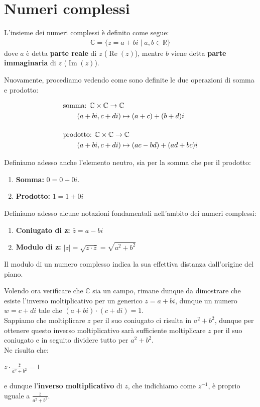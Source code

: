 \documentclass[12pt]{report}
\newcommand{\R}{\mathbb{R}}
\newcommand{\C}{\mathbb{C}}
\begin{document}
	\section{Numeri complessi}
	L'insieme dei numeri complessi è definito come segue:
	\[
		\begin{aligned}
			\C = \{ z = a + bi \mid a, b \in \R \}
		\end{aligned}
	\]
	dove $a$ è detta \textbf{parte reale} di $z$ ($\operatorname{Re}(z)$), mentre $b$ viene detta \textbf{parte immaginaria} di $z$ ($\operatorname{Im}(z)$).
	
	Nuovamente, procediamo vedendo come sono definite le due operazioni di somma e prodotto:
	
	\[
		\begin{aligned}
			&\text{somma: } \C \times \C \to \C \\
			&\hspace{0.7cm}(a+bi, c+di) \mapsto (a+c) + (b+d)i \\[0.4cm]
			&\text{prodotto: } \C \times \C \to \C \\
			&\hspace{0.7cm}(a+bi, c+di) \mapsto (ac - bd) + (ad + bc)i
		\end{aligned}
	\]
	
	Definiamo adesso anche l'elemento neutro, sia per la somma che per il prodotto:
	
	\begin{enumerate}
		\item \textbf{Somma:} $0 = 0 + 0i$.
		\item \textbf{Prodotto:} $1 = 1 + 0i$
	\end{enumerate}
	
	Definiamo adesso alcune notazioni fondamentali nell'ambito dei numeri complessi:
	
	\begin{enumerate}
		\item \textbf{Coniugato di z:} $\bar{z} = a - bi$ 
		\item \textbf{Modulo di z:} $\left|z\right| = \sqrt{z \cdot \bar{z}} = \sqrt{a^2 + b^2}$
	\end{enumerate}
	
	Il modulo di un numero complesso indica la sua effettiva distanza dall'origine del piano.
	
	Volendo ora verificare che $\C$ sia un campo, rimane dunque da dimostrare che esiste l'inverso moltiplicativo per un generico $z = a + bi$, dunque un numero $w = c + di$ tale che $ (a + bi) \cdot (c + di) = 1$.\\
	Sappiamo che moltiplicare $z$ per il suo coniugato ci risulta in $a^2 + b^2$, dunque per ottenere questo inverso moltiplicativo sarà sufficiente moltiplicare $z$ per il suo coniugato e in seguito dividere tutto per $a^2 + b^2$.\\
	Ne risulta che:
	\begin{center}
		$z \cdot \frac{\bar{z}}{a^2 + b^2} = 1$
	\end{center}
	e dunque l'\textbf{inverso moltiplicativo} di $z$, che indichiamo come $z^{-1}$, è proprio uguale a $\frac{\bar{z}}{a^2 + b^2}$.
	
\end{document}

